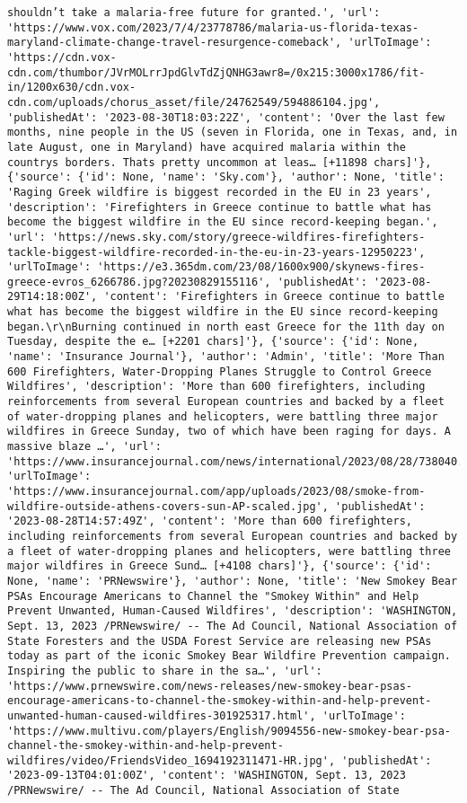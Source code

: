 \documentclass[
  letterpaper,
  DIV=11,
  numbers=noendperiod]{scrartcl}
\begin{document}
\begin{verbatim}
shouldn’t take a malaria-free future for granted.', 'url': 'https://www.vox.com/2023/7/4/23778786/malaria-us-florida-texas-maryland-climate-change-travel-resurgence-comeback', 'urlToImage': 'https://cdn.vox-cdn.com/thumbor/JVrMOLrrJpdGlvTdZjQNHG3awr8=/0x215:3000x1786/fit-in/1200x630/cdn.vox-cdn.com/uploads/chorus_asset/file/24762549/594886104.jpg', 'publishedAt': '2023-08-30T18:03:22Z', 'content': 'Over the last few months, nine people in the US (seven in Florida, one in Texas, and, in late August, one in Maryland) have acquired malaria within the countrys borders. Thats pretty uncommon at leas… [+11898 chars]'}, {'source': {'id': None, 'name': 'Sky.com'}, 'author': None, 'title': 'Raging Greek wildfire is biggest recorded in the EU in 23 years', 'description': 'Firefighters in Greece continue to battle what has become the biggest wildfire in the EU since record-keeping began.', 'url': 'https://news.sky.com/story/greece-wildfires-firefighters-tackle-biggest-wildfire-recorded-in-the-eu-in-23-years-12950223', 'urlToImage': 'https://e3.365dm.com/23/08/1600x900/skynews-fires-greece-evros_6266786.jpg?20230829155116', 'publishedAt': '2023-08-29T14:18:00Z', 'content': 'Firefighters in Greece continue to battle what has become the biggest wildfire in the EU since record-keeping began.\r\nBurning continued in north east Greece for the 11th day on Tuesday, despite the e… [+2201 chars]'}, {'source': {'id': None, 'name': 'Insurance Journal'}, 'author': 'Admin', 'title': 'More Than 600 Firefighters, Water-Dropping Planes Struggle to Control Greece Wildfires', 'description': 'More than 600 firefighters, including reinforcements from several European countries and backed by a fleet of water-dropping planes and helicopters, were battling three major wildfires in Greece Sunday, two of which have been raging for days. A massive blaze …', 'url': 'https://www.insurancejournal.com/news/international/2023/08/28/738040.htm', 'urlToImage': 'https://www.insurancejournal.com/app/uploads/2023/08/smoke-from-wildfire-outside-athens-covers-sun-AP-scaled.jpg', 'publishedAt': '2023-08-28T14:57:49Z', 'content': 'More than 600 firefighters, including reinforcements from several European countries and backed by a fleet of water-dropping planes and helicopters, were battling three major wildfires in Greece Sund… [+4108 chars]'}, {'source': {'id': None, 'name': 'PRNewswire'}, 'author': None, 'title': 'New Smokey Bear PSAs Encourage Americans to Channel the "Smokey Within" and Help Prevent Unwanted, Human-Caused Wildfires', 'description': 'WASHINGTON, Sept. 13, 2023 /PRNewswire/ -- The Ad Council, National Association of State Foresters and the USDA Forest Service are releasing new PSAs today as part of the iconic Smokey Bear Wildfire Prevention campaign. Inspiring the public to share in the sa…', 'url': 'https://www.prnewswire.com/news-releases/new-smokey-bear-psas-encourage-americans-to-channel-the-smokey-within-and-help-prevent-unwanted-human-caused-wildfires-301925317.html', 'urlToImage': 'https://www.multivu.com/players/English/9094556-new-smokey-bear-psa-channel-the-smokey-within-and-help-prevent-wildfires/video/FriendsVideo_1694192311471-HR.jpg', 'publishedAt': '2023-09-13T04:01:00Z', 'content': 'WASHINGTON, Sept. 13, 2023 /PRNewswire/ -- The Ad Council, National Association of State 
\end{verbatim}
\end{document}
